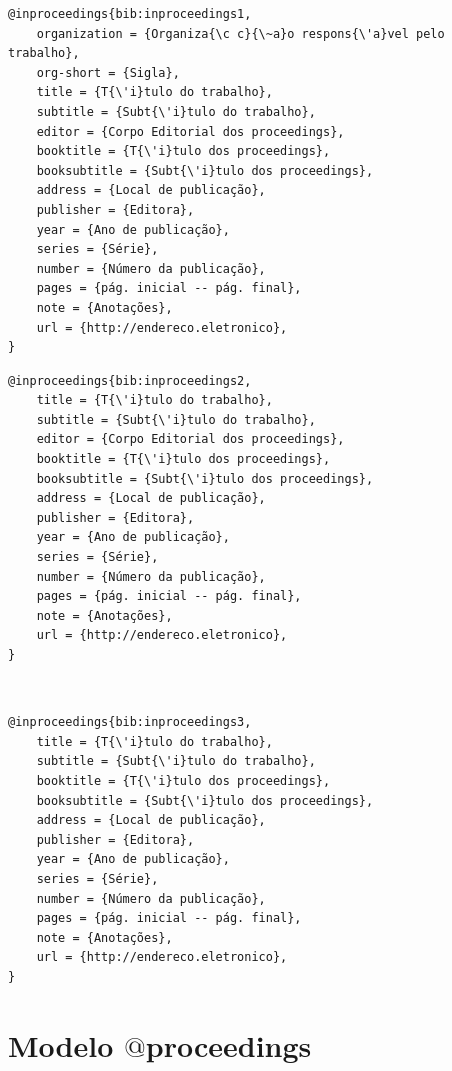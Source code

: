 \documentclass[a4paper,12pt,oneside,onecolumn,final,fleqn]{repUERJ}
\begin{document}
\noindent{}

\begin{verbatim}
@inproceedings{bib:inproceedings1,
    organization = {Organiza{\c c}{\~a}o respons{\'a}vel pelo trabalho},
    org-short = {Sigla},
    title = {T{\'i}tulo do trabalho},
    subtitle = {Subt{\'i}tulo do trabalho},
    editor = {Corpo Editorial dos proceedings},
    booktitle = {T{\'i}tulo dos proceedings},
    booksubtitle = {Subt{\'i}tulo dos proceedings},
    address = {Local de publicação},
    publisher = {Editora},
    year = {Ano de publicação},
    series = {Série},
    number = {Número da publicação},
    pages = {pág. inicial -- pág. final},
    note = {Anotações},
    url = {http://endereco.eletronico},
}
\end{verbatim}

\noindent{}

\begin{verbatim}
@inproceedings{bib:inproceedings2,
    title = {T{\'i}tulo do trabalho},
    subtitle = {Subt{\'i}tulo do trabalho},
    editor = {Corpo Editorial dos proceedings},
    booktitle = {T{\'i}tulo dos proceedings},
    booksubtitle = {Subt{\'i}tulo dos proceedings},
    address = {Local de publicação},
    publisher = {Editora},
    year = {Ano de publicação},
    series = {Série},
    number = {Número da publicação},
    pages = {pág. inicial -- pág. final},
    note = {Anotações},
    url = {http://endereco.eletronico},
}
\end{verbatim}

\noindent{}\\

\begin{verbatim}
@inproceedings{bib:inproceedings3,
    title = {T{\'i}tulo do trabalho},
    subtitle = {Subt{\'i}tulo do trabalho},
    booktitle = {T{\'i}tulo dos proceedings},
    booksubtitle = {Subt{\'i}tulo dos proceedings},
    address = {Local de publicação},
    publisher = {Editora},
    year = {Ano de publicação},
    series = {Série},
    number = {Número da publicação},
    pages = {pág. inicial -- pág. final},
    note = {Anotações},
    url = {http://endereco.eletronico},
}
\end{verbatim}

\section{Modelo $@$proceedings}
\end{document}
